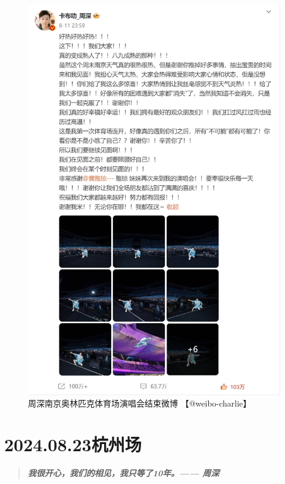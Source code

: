 \documentclass[]{ctexbook}
\begin{document}
\begin{figure}

{\centering \includegraphics[width=400pt]{img/weibo/nanjing-20240811} 

}

\caption{周深南京奥林匹克体育场演唱会结束微博 【@weibo-charlie】}\label{fig:unnamed-chunk-65}
\end{figure}

\chapter{2024.08.23杭州场}\label{hangzhou-20240823}

\begin{quote}
\textbf{\emph{我很开心，我们的相见，我只等了10年。------ 周深}}
\end{quote}
\end{document}
